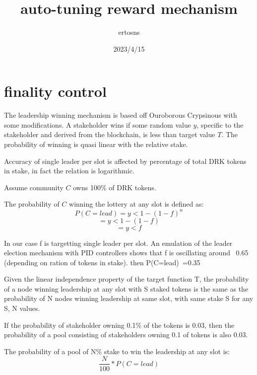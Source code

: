 \documentclass{article}
\begin{document}
\title {auto-tuning reward mechanism}
\author {ertosns}
\date {2023/4/15}
\maketitle


\section{finality control}

\begin{description}
\item The leadership winning mechanism is based off Ouroborous Crypsinous
with some modifications. A stakeholder wins if some random value $y$,
specific to the stakeholder and derived from the blockchain, is less
than target value $T$. The probability of winning is quasi linear with
the relative stake.

\item Accuracy of single leader per slot is affected by percentage of total
DRK tokens in stake, in fact the relation is logarithmic.

\item Assume community $C$ owns 100\% of DRK tokens.

\item The probability of $C$ winning the lottery at any slot is defined as:
  $$P(C=lead) = y < 1 -(1-f)^\alpha $$
  $$= y < 1 -(1-f) $$
  $$= y < f$$

\item In our case f is targetting single leader per slot. An emulation of
the leader election mechanism with PID controllers shows that f is
oscillating around ~0.65 (depending on ration of tokens in stake). then P(C=lead)~=0.35


\item Given the linear independence property of the target function T, the
probability of a node winning leadership at any slot with S staked tokens
is the same as the probability of N nodes winning leadership at same slot,
with same stake S for any S, N values.

\item If the probability of stakeholder owning 0.1\% of the tokens is 0.03,
then the probability of a pool consisting of stakeholders owning 0.1%
of tokens is also 0.03.

\item The probability of a pool of N\% stake to win the leadership at any slot is: $$ \frac{N}{100}*P(C=lead)$$




\end{description}
\end{document}
